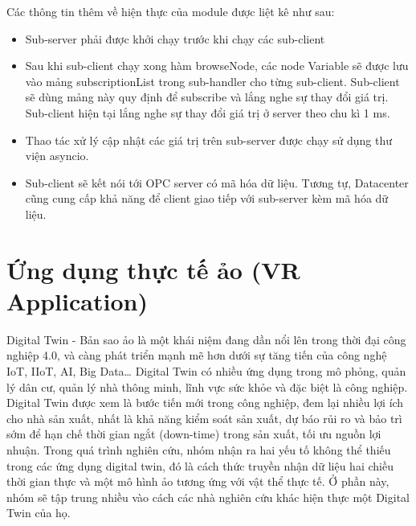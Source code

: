 Các thông tin thêm về hiện thực của module được liệt kê như sau:
\begin{itemize}
    \item Sub-server phải được khởi chạy trước khi chạy các sub-client
    \item Sau khi sub-client chạy xong hàm browseNode, các node Variable sẽ được lưu vào mảng subscriptionList trong sub-handler cho từng sub-client. Sub-client sẽ dùng mảng này quy định để subscribe và lắng nghe sự thay đổi giá trị. Sub-client hiện tại lắng nghe sự thay đổi giá trị ở server theo chu kì 1 ms.
    \item Thao tác xử lý cập nhật các giá trị trên sub-server được chạy sử dụng thư viện asyncio.
    \item Sub-client sẽ kết nói tới OPC server có mã hóa dữ liệu. Tương tự, Datacenter cũng cung cấp khả năng để client giao tiếp với sub-server kèm mã hóa dữ liệu.
\end{itemize}

\section{Ứng dụng thực tế ảo (VR Application)}


Digital Twin - Bản sao ảo là một khái niệm đang dần nổi lên trong thời đại công nghiệp 4.0, và càng phát triển mạnh mẽ hơn dưới sự tăng tiến của công nghệ IoT, IIoT, AI, Big Data… Digital Twin có nhiều ứng dụng trong mô phỏng, quản lý dân cư, quản lý nhà thông minh, lĩnh vực sức khỏe và đặc biệt là công nghiệp. Digital Twin được xem là bước tiến mới trong công nghiệp, đem lại nhiều lợi ích cho nhà sản xuất, nhất là khả năng kiểm soát sản xuất, dự báo rủi ro và bảo trì sớm để hạn chế thời gian ngắt (down-time) trong sản xuất, tối ưu nguồn lợi nhuận. Trong quá trình nghiên cứu, nhóm nhận ra hai yếu tố không thể thiếu trong các ứng dụng digital twin, đó là cách thức truyền nhận dữ liệu hai chiều thời gian thực và một mô hình ảo tương ứng với vật thể thực tế. Ở phần này, nhóm sẽ tập trung nhiều vào cách các nhà nghiên cứu khác hiện thực một Digital Twin của họ. 

